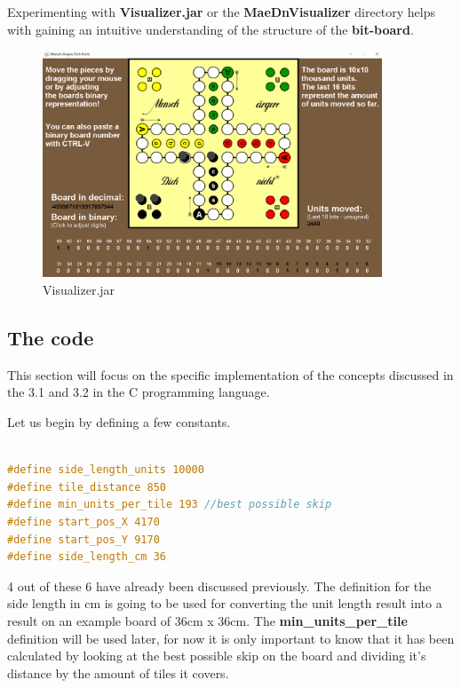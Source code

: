 \documentclass[12pt]{article}
\begin{document}
Experimenting with \textbf{Visualizer.jar} or the \textbf{MaeDnVisualizer} directory helps with gaining an intuitive understanding of the structure of the \textbf{bit-board}.

\begin{figure}[htbp]
    \centering
    \includegraphics[width=0.9\textwidth]{images/Figure6}
    \caption{Visualizer.jar}
    \label{fig:visualizer}
\end{figure}

\newpage

\subsection{The code}

This section will focus on the specific implementation of the concepts discussed in the 3.1 and 3.2 in the C programming language.

Let us begin by defining a few constants.

\begin{lstlisting}[language=C, caption={Distance definitions}, label={lst:distance-defs}]

#define side_length_units 10000
#define tile_distance 850
#define min_units_per_tile 193 //best possible skip
#define start_pos_X 4170
#define start_pos_Y 9170
#define side_length_cm 36

\end{lstlisting}

4 out of these 6 have already been discussed previously. The definition for the side length in cm is going to be used for converting the unit length result into a result on an example board of 36cm x 36cm. The \textbf{min\_units\_per\_tile} definition will be used later, for now it is only important to know that it has been calculated by looking at the best possible skip on the board and dividing it's distance by the amount of tiles it covers.
\end{document}
